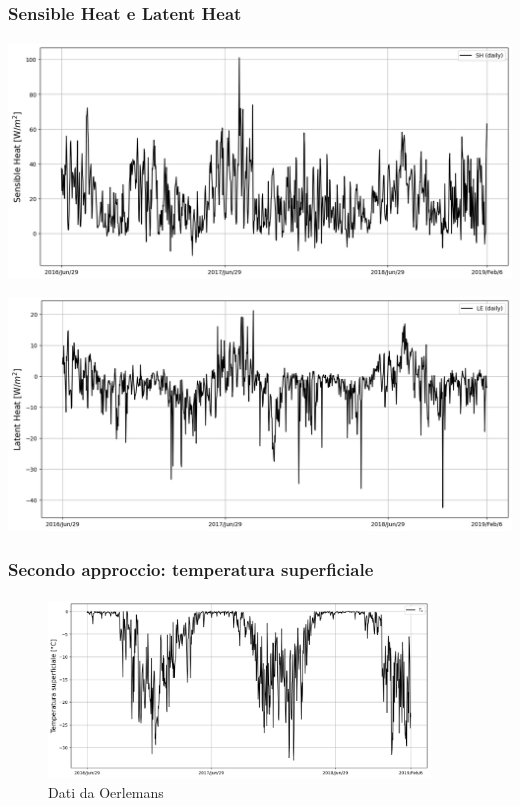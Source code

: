 \begin{frame}
    \frametitle{Sensible Heat e Latent Heat}
    \framesubtitle{}

    \center
    \begin{minipage}{0.5\textwidth}
        \includegraphics[width=\textwidth]{Immagini/sensibleHeatYear.png}
    \end{minipage}
    \begin{minipage}{0.5\textwidth}
        \includegraphics[width=\textwidth]{Immagini/latentHeatYear.png}
    \end{minipage}
  
\end{frame}


\begin{frame}
    \frametitle{Secondo approccio: temperatura superficiale}
    \framesubtitle{}

    \begin{figure}
        \includegraphics[width=0.9\textwidth]{Immagini/tSupAlt.png}
        \caption{Dati da Oerlemans}
    \end{figure}
  
\end{frame}


